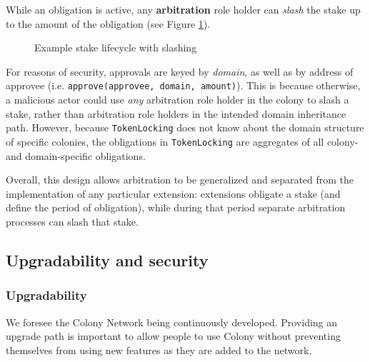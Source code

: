 While an obligation is active, any \textbf{arbitration} role holder can \textit{slash} the stake up to the amount of the obligation (see Figure \ref{fig:stake-slash}).

\begin{figure}[h]
    \centering
{}
 \caption{Example stake lifecycle with slashing}
 \label{fig:stake-slash}
\end{figure}

For reasons of security, approvals are keyed by \textit{domain}, as well as by address of approvee (i.e. \texttt{approve(approvee, domain, amount)}). This is because otherwise, a malicious actor could use \textit{any} arbitration role holder in the colony to slash a stake, rather than arbitration role holders in the intended domain inheritance path. However, because \texttt{TokenLocking} does not know about the domain structure of specific colonies, the obligations in \texttt{TokenLocking} are aggregates of all colony- and domain-specific obligations.

Overall, this design allows arbitration to be generalized and separated from the implementation of any particular extension: extensions obligate a stake (and define the period of obligation), while during that period separate arbitration processes can slash that stake.

\subsection{Upgradability and security}\label{subsec:upgradability}\label{sec:escape-hatches}

\subsubsection{Upgradability}

We foresee the Colony Network being continuously developed. Providing an upgrade path is important to allow people to use Colony without preventing themselves from using new features as they are added to the network.

